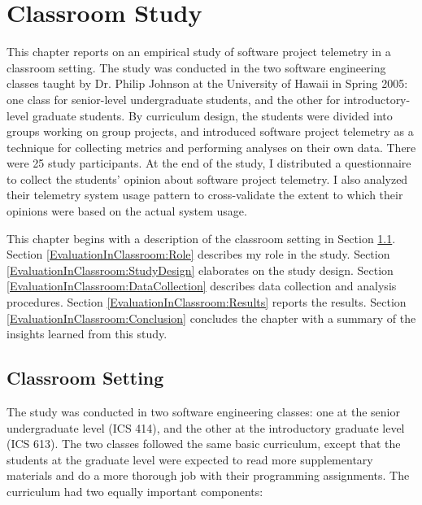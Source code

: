 \chapter{Classroom Study}  \label{Chapter:EvaluationInClassroom}
 
This chapter reports on an empirical study of software project telemetry in a classroom setting. The study was conducted in the two software engineering classes taught by Dr. Philip Johnson at the University of Hawaii in Spring 2005: one class for senior-level undergraduate students, and the other for introductory-level graduate students. By curriculum design, the students were divided into groups working on group projects, and introduced software project telemetry as a technique for collecting metrics and performing analyses on their own data. There were 25 study participants. At the end of the study, I distributed a questionnaire to collect the students' opinion about software project telemetry. I also analyzed their telemetry system usage pattern to cross-validate the extent to which their opinions were based on the actual system usage.
	
This chapter begins with a description of the classroom setting in Section \ref{EvaluationInClassroom:Setting}.
Section \ref{EvaluationInClassroom:Role} describes my role in the study.
Section \ref{EvaluationInClassroom:StudyDesign} elaborates on the study design.
Section \ref{EvaluationInClassroom:DataCollection} describes data collection and analysis procedures.
Section \ref{EvaluationInClassroom:Results} reports the results. 
Section \ref{EvaluationInClassroom:Conclusion} concludes the chapter with a summary of the insights learned from this study.








\section{Classroom Setting} \label{EvaluationInClassroom:Setting}

The study was conducted in two software engineering classes: one at the senior undergraduate level (ICS 414), and the other at the introductory graduate level (ICS 613). The two classes followed the same basic curriculum, except that the students at the graduate level were expected to read more supplementary materials and do a more thorough job with their programming assignments. The curriculum had two equally important components:

